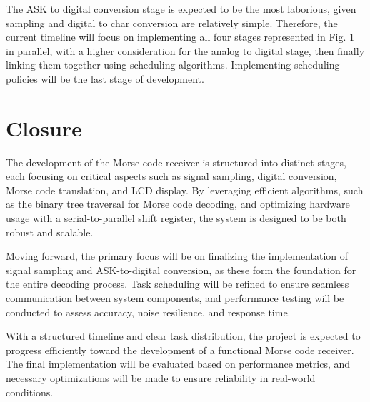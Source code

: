 \documentclass{cce2014-design}
\begin{document}
The ASK to digital conversion stage is expected to be the most laborious, given sampling and digital to char conversion are relatively simple. Therefore, the current timeline will focus on implementing all four stages represented in Fig. 1 in parallel, with a higher consideration for the analog to digital stage, then finally linking them together using scheduling algorithms. Implementing scheduling policies will be the last stage of development.


\section{Closure}
The development of the Morse code receiver is structured into distinct stages, each focusing on critical aspects such as signal sampling, digital conversion, Morse code translation, and LCD display. By leveraging efficient algorithms, such as the binary tree traversal for Morse code decoding, and optimizing hardware usage with a serial-to-parallel shift register, the system is designed to be both robust and scalable.

Moving forward, the primary focus will be on finalizing the implementation of signal sampling and ASK-to-digital conversion, as these form the foundation for the entire decoding process. Task scheduling will be refined to ensure seamless communication between system components, and performance testing will be conducted to assess accuracy, noise resilience, and response time.

With a structured timeline and clear task distribution, the project is expected to progress efficiently toward the development of a functional Morse code receiver. The final implementation will be evaluated based on performance metrics, and necessary optimizations will be made to ensure reliability in real-world conditions.






\begin{bibliography}

\end{bibliography}
\end{document}
